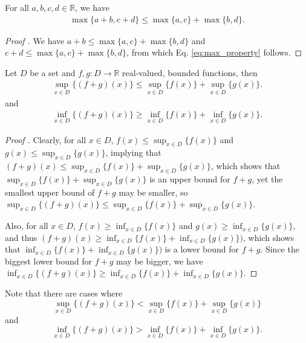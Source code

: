 \begin{theorem}\label{thrm:max_property}
	For all $a, b, c, d\in\mathbb R$, we have 
	\begin{align}\label{eq:max_property}
		\max\{a + b, c + d\} \leq \max\{a, c\} + \max\{b, d\}.
	\end{align}
\end{theorem}

\begin{proof}[Proof \cite{1975962}]
	We have $a + b \leq \max\{a, c\} + \max\{b, d\}$ and $c + d \leq \max\{a, c\} + \max\{b, d\}$, from which Eq. \eqref{eq:max_property} follows.
\end{proof}

\begin{theorem}\label{thrm:sup_inequality}
	Let $D$ be a set and $f, g: D\to \mathbb R$ real-valued, bounded functions, then 
	\begin{align}\label{eq:sup_inequality}
		\sup_{x\in D}\{(f + g)(x)\} \leq \sup_{x\in D}\{f(x)\} + \sup_{x\in D}\{g(x)\}.
	\end{align}
	and
	\begin{align}
		\inf_{x\in D}\{(f+g)(x)\} \geq \inf_{x\in D}\{f(x)\} + \inf_{x\in D}\{g(x)\}.
	\end{align}
\end{theorem}

\begin{proof}[Proof \cite{207335, 207339}]
	Clearly, for all $x\in D$, $f(x) \leq \sup_{x\in D}\{f(x)\}$ and $g(x) \leq \sup_{x\in D}\{g(x)\}$, implying that $(f+g)(x) \leq \sup_{x\in D}\{f(x)\} + \sup_{x\in D}\{g(x)\}$, which shows that $\sup_{x\in D}\{f(x)\} + \sup_{x\in D}\{g(x)\}$ is an upper bound for $f+g$, yet the smallest upper bound of $f+g$ may be smaller, so $\sup_{x\in D}\{(f + g)(x)\} \leq \sup_{x\in D}\{f(x)\} + \sup_{x\in D}\{g(x)\}$.
	
	Also, for all $x\in D$, $f(x)\geq \inf_{x\in D}\{f(x)\}$ and $g(x) \geq \inf_{x\in D}\{g(x)\}$, and thus $(f+g)(x) \geq \inf_{x\in D}\{f(x)\} + \inf_{x\in D}\{g(x)\})$, which shows that $\inf_{x\in D}\{f(x)\} + \inf_{x\in D}\{g(x)\})$ is a lower bound for $f + g$. Since the biggest lower bound for $f + g$ may be bigger, we have $\inf_{x\in D}\{(f+g)(x)\} \geq \inf_{x\in D}\{f(x)\} + \inf_{x\in D}\{g(x)\}$.
\end{proof}

\begin{remark}
	Note that there are cases where $$\sup_{x\in D}\{(f + g)(x)\} < \sup_{x\in D}\{f(x)\} + \sup_{x\in D}\{g(x)\}$$ and $$\inf_{x\in D}\{(f + g)(x)\} > \inf_{x\in D}\{f(x)\} + \inf_{x\in D}\{g(x)\}.$$
\end{remark}

